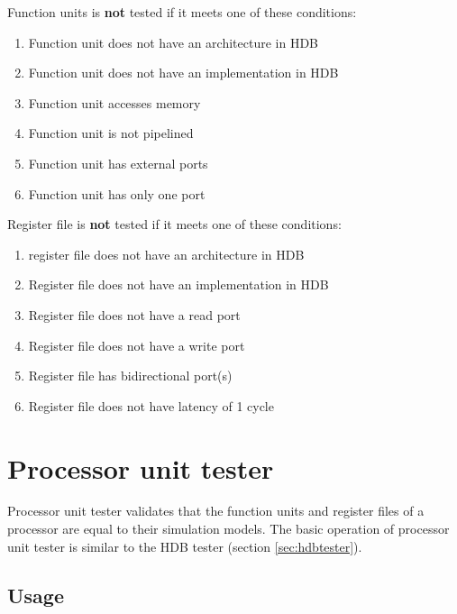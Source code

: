 \documentclass[twoside]{tceusermanual}
\begin{document}
Function units is \textbf{not} tested if it meets one of these conditions:

\begin{enumerate}
 \item Function unit does not have an architecture in HDB

 \item Function unit does not have an implementation in HDB

 \item Function unit accesses memory

 \item Function unit is not pipelined

 \item Function unit has external ports

 \item Function unit has only one port
\end{enumerate}

Register file is \textbf{not} tested if it meets one of these conditions:

\begin{enumerate}
 \item register file does not have an architecture in HDB

 \item Register file does not have an implementation in HDB

 \item Register file does not have a read port

 \item Register file does not have a write port

 \item Register file has bidirectional port(s)

 \item Register file does not have latency of 1 cycle
\end{enumerate}


\section{Processor unit tester}

Processor unit tester validates that the function units and register files of
a processor are equal to their simulation models. The basic operation of processor
unit tester is similar to the HDB tester (section \ref{sec:hdbtester}).

\subsection{Usage}
\end{document}
